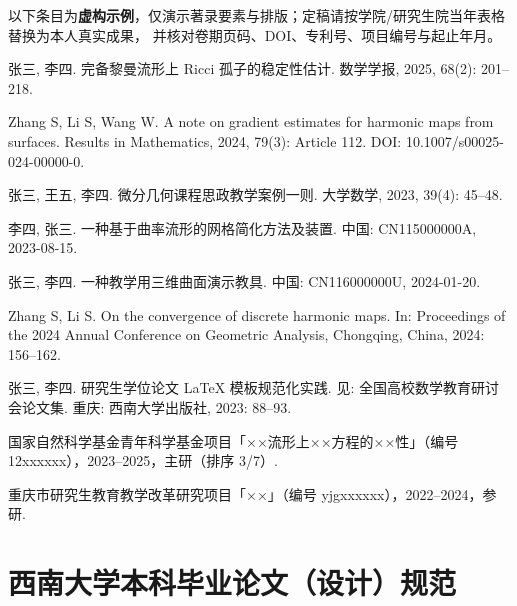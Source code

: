 \begin{publications}
以下条目为\textbf{虚构示例}，仅演示著录要素与排版；定稿请按学院/研究生院当年表格替换为本人真实成果，
并核对卷期页码、DOI、专利号、项目编号与起止年月。

\begin{swupubenum}
  \item 张三, 李四. 完备黎曼流形上 Ricci 孤子的稳定性估计.%
  数学学报, 2025, 68(2): 201--218.
  \item Zhang S, Li S, Wang W. A note on gradient estimates for harmonic maps from%
    surfaces.
    Results in Mathematics, 2024, 79(3): Article 112. DOI: 10.1007/s00025-024-00000-0.
  \item 张三, 王五, 李四. 微分几何课程思政教学案例一则. 大学数学, 2023, 39(4): 45--48.
\end{swupubenum}

\begin{swupubenum}
  \item 李四, 张三. 一种基于曲率流形的网格简化方法及装置.%
  中国: CN115000000A, 2023-08-15.
  \item 张三, 李四. 一种教学用三维曲面演示教具. 中国: CN116000000U, 2024-01-20.
\end{swupubenum}

\begin{swupubenum}
  \item Zhang S, Li S. On the convergence of discrete harmonic maps. In: Proceedings of%
    the 2024 Annual Conference on Geometric Analysis, Chongqing, China, 2024: 156--162.
  \item 张三, 李四. 研究生学位论文 \LaTeX{} 模板规范化实践. 见: 全国高校数学教育研讨会论文集. 重庆: 西南大学出版社, 2023: 88--93.
\end{swupubenum}

\begin{swupubenum}
  \item 国家自然科学基金青年科学基金项目「××流形上××方程的××性」（编号 12xxxxxx），2023--2025，主研（排序 3/7）.
  \item 重庆市研究生教育教学改革研究项目「××」（编号 yjgxxxxxx），2022--2024，参研.
\end{swupubenum}
\end{publications}

\appendix
\chapter{西南大学本科毕业论文（设计）规范}\label{app:swu-undergrad-spec}

